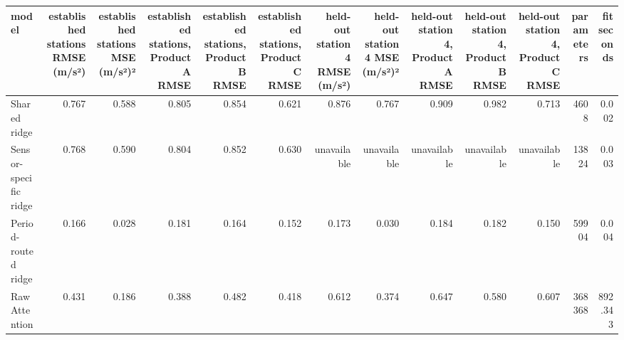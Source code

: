 \begin{tabular}{lrrrrrrrrrrrr}
\toprule
model & established stations RMSE (m/s²) & established stations MSE (m/s²)² & established stations, Product A RMSE & established stations, Product B RMSE & established stations, Product C RMSE & held-out station 4 RMSE (m/s²) & held-out station 4 MSE (m/s²)² & held-out station 4, Product A RMSE & held-out station 4, Product B RMSE & held-out station 4, Product C RMSE & parameters & fit seconds \\
\midrule
Shared ridge & 0.767 & 0.588 & 0.805 & 0.854 & 0.621 & 0.876 & 0.767 & 0.909 & 0.982 & 0.713 & 4608 & 0.002 \\
Sensor-specific ridge & 0.768 & 0.590 & 0.804 & 0.852 & 0.630 & unavailable & unavailable & unavailable & unavailable & unavailable & 13824 & 0.003 \\
Period-routed ridge & 0.166 & 0.028 & 0.181 & 0.164 & 0.152 & 0.173 & 0.030 & 0.184 & 0.182 & 0.150 & 59904 & 0.004 \\
Raw Attention & 0.431 & 0.186 & 0.388 & 0.482 & 0.418 & 0.612 & 0.374 & 0.647 & 0.580 & 0.607 & 368368 & 892.343 \\
\bottomrule
\end{tabular}
